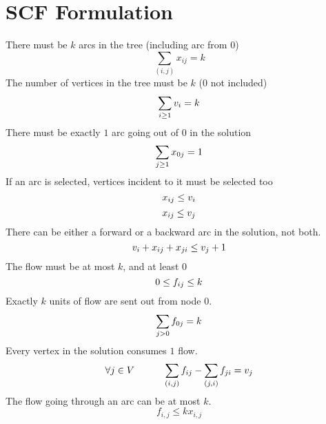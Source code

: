 \documentclass[a4paper]{article}
\numberwithin{equation}{section}
\begin{document}
\section{SCF Formulation}
There must be $k$ arcs in the tree (including arc from $0$)
\begin{equation}
	\sum_{(i,j)} x_{ij} = k
\end{equation}
The number of vertices in the tree must be $k$ ($0$ not included)
\begin{equation}
	\sum_{i \geq 1}v_i =k \\
\end{equation}
There must be exactly $1$ arc going out of $0$ in the solution
\begin{equation}
	\sum_{j \geq 1} x_{0j}=1\\
\end{equation}
If an arc is selected, vertices incident to it must be selected too
\begin{equation}
	x_{ij} \leq v_i\\
\end{equation}
\begin{equation}
	x_{ij} \leq v_j\\
\end{equation}
There can be either a forward or a backward arc in the solution, not both.
\begin{equation}
	v_i + x_{ij} + x_{ji} \leq v_j + 1\\
\end{equation}
The flow must be at most $k$, and at least $0$
\begin{equation}
	0 \leq f_{ij} \leq k\\
\end{equation}
Exactly $k$ units of flow are sent out from node $0$.
\begin{equation}
	\sum_{j>0} f_{0j}=k \\
\end{equation}
Every vertex in the solution consumes $1$ flow.
\begin{equation}
  \forall j \in V \hspace{30pt}	\sum_{(i,j)} f_{ij} - \sum_{(j,i)} f_{ji} = v_j\\
\end{equation}
The flow going through an arc can be at most $k$.
\begin{equation}
	f_{i,j}\leq kx_{i,j}
\end{equation}
\end{document}
